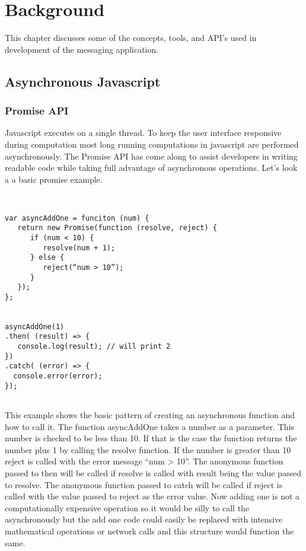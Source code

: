 \chapter{Background}


This chapter discusses some of the concepts, tools, and API’s used in development of the messaging application.


\section{Asynchronous Javascript}


\subsection{Promise API}


Javascript executes on a single thread. To keep the user interface responsive during computation most long running computations in javascript are performed asynchronously. The Promise API has come along to assist developers in writing readable code while taking full advantage of asynchronous operations. Let’s look a a basic promise example.


\begin{lstlisting}


var asyncAddOne = funciton (num) {
   return new Promise(function (resolve, reject) {
      if (num < 10) {
         resolve(num + 1);
      } else {
         reject(“num > 10”);
      }  
   }); 
}; 


asyncAddOne(1)
.then( (result) => {
   console.log(result); // will print 2
})
.catch( (error) => {
  console.error(error);
});


\end{lstlisting}


This example shows the basic pattern of creating an asynchronous function and how to call it. The function asyncAddOne takes a number as a parameter. This number is checked to be less than 10. If that is the case the function returns the number plus 1 by calling the resolve function. If the number is greater than 10 reject is called with the error message “num > 10”. The anonymous function passed to then will be called if resolve is called with result being the value passed to resolve. The anonymous function passed to catch will be called if reject is called with the value passed to reject as the error value. Now adding one is not a computationally expensive operation so it would be silly to call the asynchronously but the add one code could easily be replaced with intensive mathematical operations or network calls and this structure would function the same.


